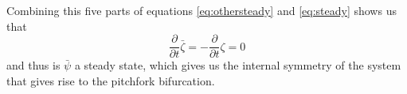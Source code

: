 Combining this five parts of equations \ref{eq:othersteady} and \ref{eq:steady} shows us that
$$\frac{\partial}{\partial t}\bar{\zeta}=-\frac{\partial}{\partial t}\zeta=0$$ and thus is $\bar{\psi}$ a steady state, which gives us the internal symmetry of the system that gives rise to the pitchfork bifurcation.



